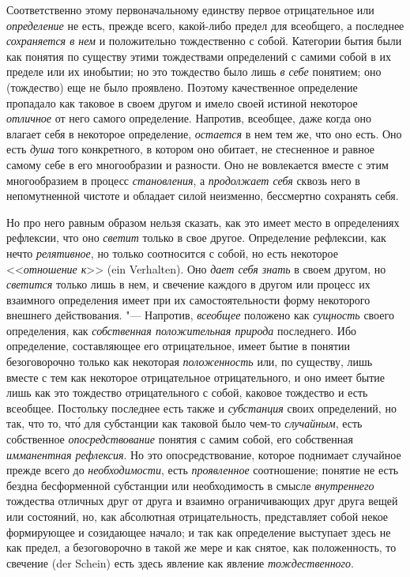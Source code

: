 Соответственно этому первоначальному единству первое
отрицательное или {\em определение}
не есть, прежде всего, какой-либо предел для всеобщего, а
последнее {\em сохраняется в нем}
и положительно тождественно с собой. Категории бытия
были как понятия по существу этими тождествами определений
с самими собой в их пределе или их инобытии; но это тождество было лишь
{\em в себе} понятием;
оно (тождество) еще не было проявлено. Поэтому качественное определение
пропадало как таковое в своем другом и имело своей истиной некоторое
{\em отличное} от него
самого определение. Напротив, всеобщее, даже когда оно влагает себя в
некоторое определение, {\em остается}
в нем тем же, что оно есть. Оно есть
{\em душа} того
конкретного, в котором оно обитает, не стесненное и равное самому себе в
его многообразии и разности. Оно не вовлекается вместе с этим многообразием
в процесс {\em становления},
а {\em продолжает себя}
сквозь него в непомутненной чистоте и обладает силой
неизменно, бессмертно сохранять себя.

Но про него равным образом нельзя сказать, как это имеет место
в определениях рефлексии, что оно
{\em светит} только в
свое другое. Определение рефлексии, как нечто
{\em релятивное}, но
только соотносится с собой, но есть некоторое
<<{\em отношение к}>> (ein Verhalten).
Оно {\em дает себя знать}
в своем другом, но
{\em светится} только
лишь в нем, и свечение каждого в другом или процесс их взаимного
определения имеет при их самостоятельности форму некоторого внешнего
действования. "--- Напротив,
{\em всеобщее} положено
как {\em сущность} своего
определения, как {\em собственная
положительная природа} последнего. Ибо определение,
составляющее его отрицательное, имеет бытие в понятии безоговорочно только
как некоторая {\em положенность}
или, по существу, лишь вместе с тем как некоторое
отрицательное отрицательного, и оно имеет бытие лишь как это тождество
отрицательного с собой, каковое тождество и есть всеобщее. Постольку
последнее есть также и {\em субстанция}
своих определений, но так, что то, чт\'{о} для субстанции как
таковой было чем-то {\em случайным},
есть собственное
{\em опосредствование}
понятия с самим собой, его собственная
{\em имманентная рефлексия}.
Но это опосредствование, которое поднимает случайное прежде
всего до {\em необходимости},
есть {\em проявленное}
соотношение; понятие не есть бездна бесформенной субстанции
или необходимость в смысле
{\em внутреннего}
тождества отличных друг от друга и взаимно ограничивающих
друг друга вещей или
состояний,
но, как абсолютная отрицательность, представляет собой некое
формирующее и созидающее начало; и так как определение выступает здесь не
как предел, а безоговорочно в такой же мере и как снятое, как положенность,
то свечение (der Schein) есть здесь явление как явление
{\em тождественного}.

